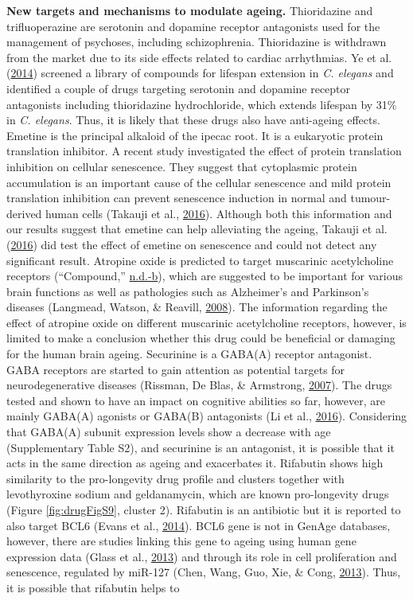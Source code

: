 \documentclass[12pt,twoside]{unicam}
\begin{document}
\textbf{New targets and mechanisms to modulate ageing.} Thioridazine and trifluoperazine are serotonin and dopamine receptor antagonists used for the management of psychoses, including schizophrenia. Thioridazine is withdrawn from the market due to its side effects related to cardiac arrhythmias. Ye et al. (\protect\hyperlink{ref-Ye2014}{2014}) screened a library of compounds for lifespan extension in \emph{C. elegans} and identified a couple of drugs targeting serotonin and dopamine receptor antagonists including thioridazine hydrochloride, which extends lifespan by 31\% in \emph{C. elegans}. Thus, it is likely that these drugs also have anti-ageing effects. Emetine is the principal alkaloid of the ipecac root. It is a eukaryotic protein translation inhibitor. A recent study investigated the effect of protein translation inhibition on cellular senescence. They suggest that cytoplasmic protein accumulation is an important cause of the cellular senescence and mild protein translation inhibition can prevent senescence induction in normal and tumour-derived human cells (Takauji et al., \protect\hyperlink{ref-Takauji2016}{2016}). Although both this information and our results suggest that emetine can help alleviating the ageing, Takauji et al. (\protect\hyperlink{ref-Takauji2016}{2016}) did test the effect of emetine on senescence and could not detect any significant result. Atropine oxide is predicted to target muscarinic acetylcholine receptors (``Compound,'' \protect\hyperlink{ref-CHEMBL2146145}{n.d.}\protect\hyperlink{ref-CHEMBL2146145}{-b}), which are suggested to be important for various brain functions as well as pathologies such as Alzheimer's and Parkinson's diseases (Langmead, Watson, \& Reavill, \protect\hyperlink{ref-Langmead2008}{2008}). The information regarding the effect of atropine oxide on different muscarinic acetylcholine receptors, however, is limited to make a conclusion whether this drug could be beneficial or damaging for the human brain ageing. Securinine is a GABA(A) receptor antagonist. GABA receptors are started to gain attention as potential targets for neurodegenerative diseases (Rissman, De Blas, \& Armstrong, \protect\hyperlink{ref-Rissman2007}{2007}). The drugs tested and shown to have an impact on cognitive abilities so far, however, are mainly GABA(A) agonists or GABA(B) antagonists (Li et al., \protect\hyperlink{ref-Li2016}{2016}). Considering that GABA(A) subunit expression levels show a decrease with age (Supplementary Table S2), and securinine is an antagonist, it is possible that it acts in the same direction as ageing and exacerbates it. Rifabutin shows high similarity to the pro-longevity drug profile and clusters together with levothyroxine sodium and geldanamycin, which are known pro-longevity drugs (Figure \ref{fig:drugFigS9}, cluster 2). Rifabutin is an antibiotic but it is reported to also target BCL6 (Evans et al., \protect\hyperlink{ref-Evans2014}{2014}). BCL6 gene is not in GenAge databases, however, there are studies linking this gene to ageing using human gene expression data (Glass et al., \protect\hyperlink{ref-Glass2013}{2013}) and through its role in cell proliferation and senescence, regulated by miR-127 (Chen, Wang, Guo, Xie, \& Cong, \protect\hyperlink{ref-Chen2013}{2013}). Thus, it is possible that rifabutin helps to 
\end{document}
